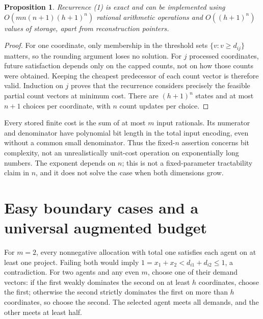 \documentclass[11pt]{article}
\newtheorem{proposition}{Proposition}
\begin{document}
\begin{proposition}
Recurrence (1) is exact and can be implemented using
$O(mn(n+1)(h+1)^n)$ rational arithmetic operations and
$O((h+1)^n)$ values of storage, apart from reconstruction pointers.
\end{proposition}
\begin{proof}
For one coordinate, only membership in the threshold sets
$\{v:v\geq d_{ij}\}$ matters, so the rounding argument loses no solution.
For $j$ processed coordinates, future satisfaction depends only on the
capped counts, not on how those counts were obtained. Keeping the
cheapest predecessor of each count vector is therefore valid. Induction
on $j$ proves that the recurrence considers precisely the feasible
partial count vectors at minimum cost. There are $(h+1)^n$ states and
at most $n+1$ choices per coordinate, with $n$ count updates per choice.
\end{proof}

Every stored finite cost is the sum of at most $m$ input rationals.
Its numerator and denominator have polynomial bit length in the total
input encoding, even without a common small denominator. Thus the
fixed-$n$ assertion concerns bit complexity, not an unrealistically
unit-cost operation on exponentially long numbers. The exponent depends
on $n$; this is not a fixed-parameter tractability claim in $n$, and it
does not solve the case when both dimensions grow.

\section*{Easy boundary cases and a universal augmented budget}
For $m=2$, every nonnegative allocation with total one satisfies each
agent on at least one project. Failing both would imply
$1=x_1+x_2<d_{i1}+d_{i2}\leq1$, a contradiction. For two agents and any
even $m$, choose one of their demand vectors: if the first weakly
dominates the second on at least $h$ coordinates, choose the first;
otherwise the second strictly dominates the first on more than $h$
coordinates, so choose the second. The selected agent meets all demands,
and the other meets at least half.
\end{document}
